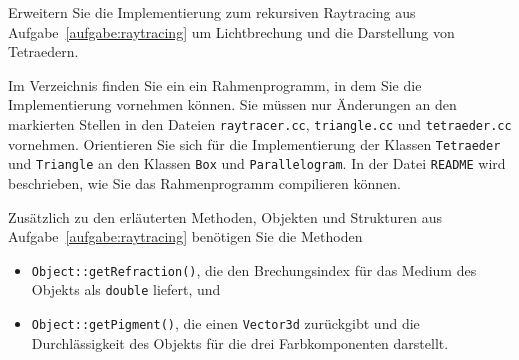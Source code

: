%
Erweitern Sie die Implementierung zum rekursiven Raytracing aus 
Aufgabe~\ref{aufgabe:raytracing} um Lichtbrechung und die Darstellung
von Tetraedern.

Im Verzeichnis  finden Sie 
ein ein Rahmenprogramm, in dem Sie die 
Implementierung vornehmen können. Sie müssen nur Änderungen an den 
markierten Stellen in den Dateien \texttt{raytracer.cc}, 
\texttt{triangle.cc} und \texttt{tetraeder.cc} vornehmen.
Orientieren Sie sich für die Implementierung der Klassen 
\texttt{Tetraeder} und \texttt{Triangle} an den Klassen \texttt{Box} 
und \texttt{Parallelogram}. In der Datei \texttt{README} wird 
beschrieben, wie Sie das Rahmenprogramm compilieren können. 

Zusätzlich zu den erläuterten Methoden, Objekten und Strukturen aus 
Aufgabe~\ref{aufgabe:raytracing} benötigen Sie die Methoden
\begin{itemize}
  \item \texttt{Object::getRefraction()}, die den Brechungsindex für das 
        Medium des Objekts als \texttt{double} liefert, und
  \item \texttt{Object::getPigment()}, die einen \texttt{Vector3d} 
        zurückgibt und die Durchlässigkeit des Objekts für die drei 
        Farbkomponenten darstellt.
\end{itemize}
  
